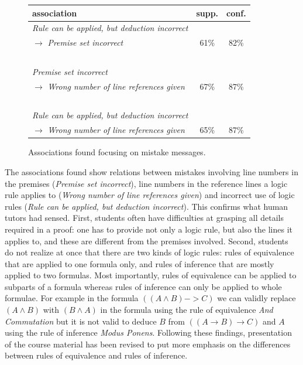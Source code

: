   
\begin{figure}
\begin{tabular}{|l|c|c|}
\hline
association & supp. & conf.\\
\hline
{\em Rule can be applied, but deduction incorrect} & \ & \ \\
 $\rightarrow $
{\em Premise set incorrect} & 61\% & 82\%\\
\ & \  & \  \\
{\em Premise set incorrect}  & \ & \ \\ 
$\rightarrow $ 
{\em Wrong number of line references given} & 67\% & 87\%\\
\ & \  & \  \\
{\em Rule can be applied, but deduction incorrect}  & \ & \ \\
$\rightarrow $  {\em Wrong number of line references given} & 65\% & 87\%\\
\hline
\end{tabular}
\caption{Associations found focusing on mistake messages.}
\label{diagnosis}
\end{figure}

The associations found  show relations between
mistakes involving line numbers in the premises
({\em Premise set incorrect}), 
  line numbers in the reference lines a logic rule 
applies to ({\em Wrong number of line references given})
and  incorrect use
 of logic rules ({\em Rule can be applied, but deduction incorrect}).
This confirms what human tutors had sensed.
First, students often have difficulties at grasping
all details required in a proof: one has to provide
not only a logic rule, but also the lines it applies to,
and these are different from the premises involved.
Second, students do not realize at once that there
are two kinds of logic rules:  rules of equivalence that
are applied to one formula only, and  rules of inference
that are mostly applied to two formulas.
Most importantly, rules of
equivalence can be applied to subparts of a formula whereas rules of
inference can only be applied to whole formulae. For example in the
formula $((A \wedge  B) -> C)$ we can validly replace $(A \wedge B)$
 with $(B \wedge A)$ in the formula 
using the rule of equivalence {\em And Commutation} but it is not valid
to deduce $B$ from  $((A \rightarrow B) \rightarrow C)$ and $A$
 using the
rule of inference {\em Modus Ponens}.
Following these findings, presentation of the course material has been revised to put more emphasis on the differences between rules of equivalence
and rules of inference.  

